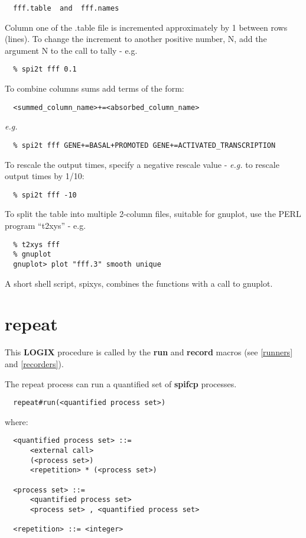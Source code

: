 \documentclass[twoside,10pt]{report}
\begin{document}
\begin{verbatim}
  fff.table  and  fff.names
\end{verbatim}

\noindent
Column one of the .table file is incremented approximately by 1 between
rows (lines).  To change the increment to another positive number, N,
add the argument N to the call to tally - e.g.

\begin{verbatim}
  % spi2t fff 0.1
\end{verbatim}

\noindent
To combine columns sums add terms of the form:

\begin{verbatim}
  <summed_column_name>+=<absorbed_column_name>
\end{verbatim}
{\em e.g.}
\begin{verbatim}
  % spi2t fff GENE+=BASAL+PROMOTED GENE+=ACTIVATED_TRANSCRIPTION
\end{verbatim}

\noindent
To rescale the output times, specify a negative rescale value - {\em e.g.}
to rescale output times by 1/10:
\begin{verbatim}
  % spi2t fff -10
\end{verbatim}

\noindent
To split the table into multiple 2-column files, suitable for gnuplot,
use the PERL program ``t2xys'' - e.g.

\begin{verbatim}
  % t2xys fff
  % gnuplot
  gnuplot> plot "fff.3" smooth unique
\end{verbatim}

\noindent
A short shell script, spixys, combines the functions with a call to gnuplot.

\section{repeat}
\label{repeat}
This {\bf LOGIX} procedure is called by the {\bf run} and
{\bf record} macros (see \ref{runners} and
\ref{recorders}).

\noindent
The repeat process can run a quantified set of {\bf spifcp}
processes.

\begin{verbatim}
  repeat#run(<quantified process set>)
\end{verbatim}

\noindent
where:

\begin{verbatim}
  <quantified process set> ::=
      <external call>
      (<process set>)
      <repetition> * (<process set>)

  <process set> ::=
      <quantified process set>
      <process set> , <quantified process set>

  <repetition> ::= <integer>
\end{verbatim}
\end{document}
